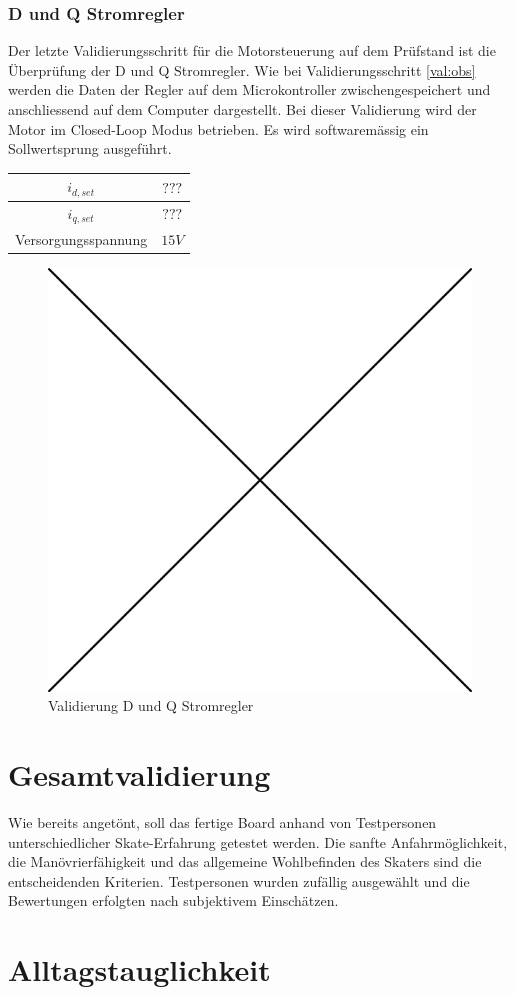 \subsubsection*{D und Q Stromregler}
Der letzte Validierungsschritt für die Motorsteuerung auf dem Prüfstand ist die Überprüfung der D und Q Stromregler. Wie bei Validierungsschritt \ref{val:obs} werden die Daten der Regler auf dem Microkontroller zwischengespeichert und anschliessend auf dem Computer dargestellt. Bei dieser Validierung wird der Motor im Closed-Loop Modus betrieben. Es wird softwaremässig ein Sollwertsprung ausgeführt.

\begin{center}
	\begin{tabular}{|c|c|}
		\hline 
		$i_{d,set}$ & $???$ \\ \hline
		$i_{q,set}$ & $???$ \\ \hline
		Versorgungsspannung & $15V$ \\ \hline
	\end{tabular} 
	\label{tab:regmessbed}
\end{center}

\begin{figure} [H]
	\centering
	\includegraphics[width=0.5\linewidth]{images/placeholder.png}
	\caption{Validierung D und Q Stromregler}
	\label{fig:reg}
\end{figure}

\section{Gesamtvalidierung}
\label{ValidGesamtv}
Wie bereits angetönt, soll das fertige Board anhand von Testpersonen unterschiedlicher Skate-Erfahrung getestet werden. Die sanfte Anfahrmöglichkeit, die Manövrierfähigkeit und das allgemeine Wohlbefinden des Skaters sind die entscheidenden Kriterien. 
Testpersonen wurden zufällig ausgewählt und die Bewertungen erfolgten nach subjektivem Einschätzen.
\section{Alltagstauglichkeit}
\label{ValidAlltag}
